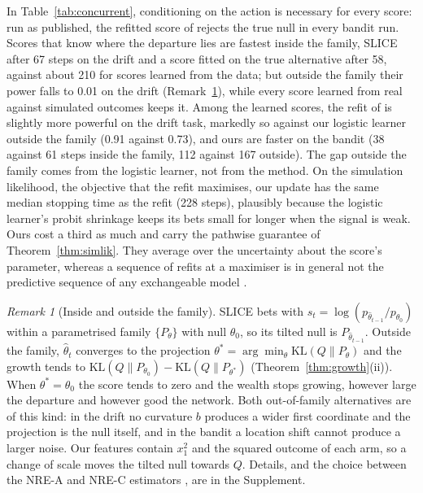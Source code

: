 \documentclass[12pt]{article}
\newcommand{\KL}{\mathrm{KL}}
\theoremstyle{remark}
\newtheorem{remark}{Remark}
\begin{document}
In Table~\ref{tab:concurrent}, conditioning on the action is necessary for
every score: run as published, the refitted score of
\citet{forre2026anytime} rejects the true null in every bandit run. Scores
that know where the departure lies are fastest inside the family, SLICE after
67 steps on the drift and a score fitted on the true alternative after 58,
against about 210 for scores learned from the data; but outside the family
their power falls to 0.01 on the drift (Remark~\ref{rem:family}), while every
score learned from real against simulated outcomes keeps it. Among the learned
scores, the refit of \citet{forre2026anytime} is slightly more powerful on the
drift task, markedly so against our logistic learner outside the family (0.91
against 0.73), and ours are faster on the bandit (38 against 61 steps inside
the family, 112 against 167 outside). The gap outside the family comes from
the logistic learner, not from the method. On the simulation likelihood, the
objective that the refit maximises, our update has the same median stopping
time as the refit (228 steps), plausibly because the logistic learner's probit
shrinkage keeps its bets small for longer when the signal is weak. Ours cost a
third as much and carry the pathwise guarantee of Theorem~\ref{thm:simlik}.
They average over the uncertainty about the score's parameter, whereas a sequence of refits at a maximiser is in general not the
predictive sequence of any exchangeable model
\citep{fortini2000exchangeability,fortini2024exchangeability}.

\begin{remark}[Inside and outside the family]\label{rem:family}
SLICE bets with $s_t = \log (p_{\hat\theta_{t-1}}/p_{\theta_0})$ within a
parametrised family $\{P_\theta\}$ with null $\theta_0$, so its tilted null is
$P_{\hat\theta_{t-1}}$. Outside the family, $\hat\theta_t$ converges to the
projection $\theta^* = \arg\min_\theta \KL(Q\|P_\theta)$ and the growth tends to
$\KL(Q\|P_{\theta_0}) - \KL(Q\|P_{\theta^*})$ (Theorem~\ref{thm:growth}(ii)).
When $\theta^* = \theta_0$ the score tends to zero and the wealth stops
growing, however large the departure and however good the network. Both
out-of-family alternatives are of this kind: in the drift no curvature $b$
produces a wider first coordinate and the projection is the null itself, and
in the bandit a location shift cannot produce a larger noise. Our features
contain $x_1^2$ and the squared outcome of each arm, so a change of scale moves
the tilted null towards $Q$. Details, and the choice between the NRE-A and
NRE-C estimators \citep{miller2022contrastive}, are in the Supplement.
\end{remark}
\end{document}
